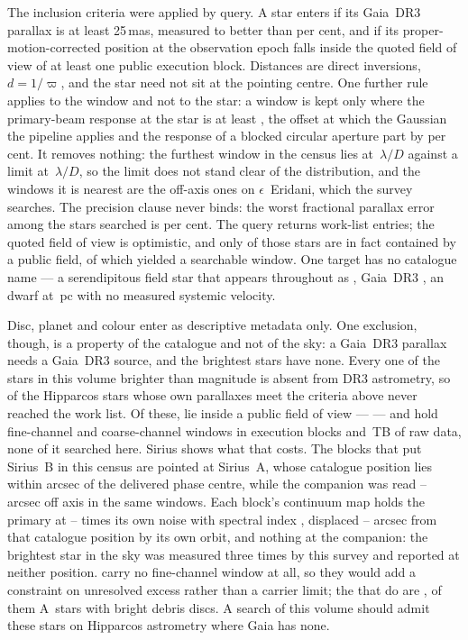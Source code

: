 The inclusion criteria were applied by query. A star enters
if its Gaia~DR3 parallax is at least 25\,mas, measured to better than
\PlxAdqlPct{} per cent, and if its proper-motion-corrected position at the
observation epoch falls inside the quoted field of view of at least one
public execution block. Distances are direct inversions, $d=1/\varpi$, and
the star need not sit at the pointing centre. One further rule applies to the
window and not to the star: a window is kept only where the primary-beam
response at the star is at least \BmFloorResp, the offset at which the
Gaussian the pipeline applies and the response of a blocked circular aperture
part by \BmFloorTolPct{} per cent. It removes nothing: the furthest window in
the census lies at \BmCensusWorstC\,$\lambda/D$ against a limit at
\BmFloorC\,$\lambda/D$, so the limit does not stand clear of the distribution,
and the windows it is nearest are the \BmEpsNCensusOff{} off-axis ones on
$\epsilon$~Eridani, which the survey searches.
The precision clause never binds: the worst fractional parallax
error among the stars searched is \SfPlxWorstPct{} per cent. The query returns
\NCensus{} work-list entries; the quoted field of view is optimistic, and
only \NGenuinelyCovered{} of those stars are in fact contained by a public
field, of which \NStars{} yielded a searchable window. One target has no
catalogue name --- a serendipitous field star that appears throughout as
\BkAlmaName, Gaia~DR3 \BkAlmaGaia, an \BkAlmaSpType{} dwarf at
\BkAlmaDistPc\,pc with no measured systemic velocity.

Disc, planet and colour enter as descriptive metadata only. One exclusion,
though, is a property of the catalogue and not of the sky: a Gaia~DR3
parallax needs a Gaia~DR3 source, and the brightest stars have none. Every
one of the \BsNBright{} stars in this volume brighter than \BsBrightMag{}
magnitude is absent from DR3 astrometry, so \BsNGap{} of the \BsNVol{}
Hipparcos stars whose own parallaxes meet the criteria above never reached
the work list.
Of these, \BsNAlmaWord{} lie inside a public field of view --- \BsStarList{}
--- and hold \BsNWinA{} fine-channel and \BsNWinB{} coarse-channel windows in
\BsNEB{} execution blocks and \BsRawTB\,TB of raw data, none of it searched
here. Sirius shows what that costs. The \BsSirNEBWord{} blocks that put
Sirius~B in this census are pointed at Sirius~A, whose catalogue position lies
within \BsSirSepA{} arcsec of the delivered phase centre, while the companion
was read \BsSirOffLo--\BsSirOffHi{} arcsec off axis in the same
\BsSirNWin{} windows. Each block's continuum map holds the primary at
\BsSirSnrLo--\BsSirSnrHi{} times its own noise with spectral index
\BsSirAlpha, displaced \BsSirCenLo--\BsSirCenHi{} arcsec from that catalogue
position by its own orbit, and nothing at the companion: the brightest star
in the sky was measured three times by this survey and reported at neither
position. \BsNoFineList{} carry no fine-channel
window at all, so they would add a constraint on unresolved excess rather
than a carrier limit; the \BsNFineWord{} that do are \BsFineList,
\BsNFineATypeWord{} of them A~stars with bright debris discs. A search of
this volume should admit these stars on Hipparcos astrometry where Gaia has
none.

